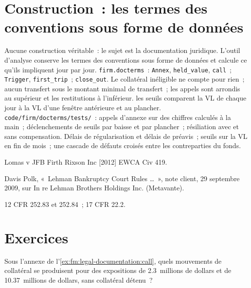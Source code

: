\section{Construction~: les termes des conventions sous forme de données}\label{bld:fm:legal-documentation:docterms}

\begin{build}
 Aucune construction véritable~: le sujet est la documentation juridique. L'outil d'analyse conserve les termes des conventions sous forme de données et calcule
ce qu'ils impliquent jour par jour.
 \texttt{firm.docterms}~: \texttt{Annex}, \texttt{held\_value}, \texttt{call}~; \texttt{Trigger}, \texttt{first\_trip}~;
\texttt{close\_out}.
 Le collatéral inéligible ne compte pour rien~; aucun transfert sous le montant minimal de transfert~; les appels sont arrondis au supérieur et les restitutions à l'inférieur.
les seuils comparent la VL de chaque jour à la VL d'une fenêtre antérieure et au plancher.
 \texttt{code/firm/docterms/tests/}~: appels d'annexe sur des chiffres calculés à la main~; déclenchements de seuils par baisse et par plancher~; résiliation avec et
sans compensation.
 Délais de régularisation et délais de préavis~; seuils sur la VL en fin de mois~; une cascade de défauts croisés entre les contreparties du fonds.
\end{build}

\begin{omsources}
\item Lomas v JFB Firth Rixson Inc [2012] EWCA Civ 419.
\item Davis Polk, «~Lehman Bankruptcy Court Rules \dots~», note client, 29 septembre 2009, sur In re Lehman Brothers Holdings Inc.
(Metavante).
\item 12 CFR 252.83 et 252.84~; 17 CFR 22.2.
\end{omsources}

\section{Exercices}

\begin{exercise}[$\star$]\label{exo:fm:legal-documentation:1}
Sous l'annexe de l'\cref{ex:fm:legal-documentation:call}, quels mouvements de collatéral se produisent pour des expositions de 2.3~millions de dollars et de 10.37~millions de dollars, sans collatéral détenu~?
\end{exercise}

